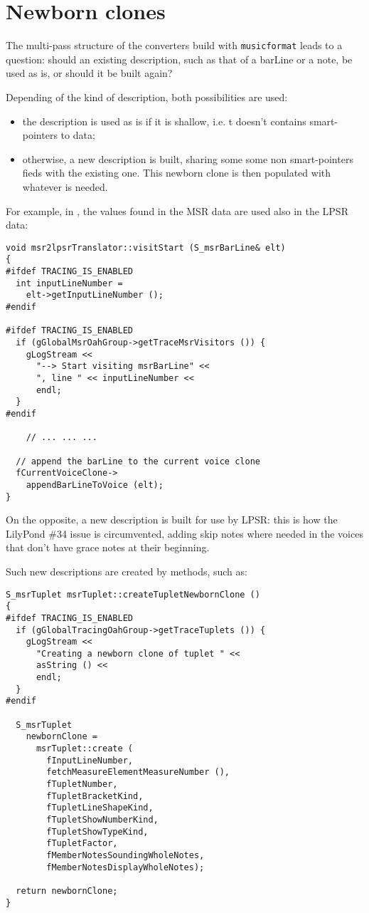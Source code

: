 \section{Newborn clones}

The multi-pass structure of the converters build with {\tt musicformat} leads to a question: should an existing description, such as that of a barLine or a note, be used as is, or should it be built again?

Depending of the kind of description, both possibilities are used:
\begin{itemize}
\item the description is used as is if it is shallow, i.e. t doesn't contains smart-pointers to data;
\item otherwise, a new description is built, sharing some some non smart-pointers fieds with the existing one. This newborn clone is then populated with whatever is needed.
\end{itemize}

For example, in \msrToLpsr{}, the  values found in the MSR data are used also in the LPSR data:
\begin{lstlisting}[language=CPlusPlus]
void msr2lpsrTranslator::visitStart (S_msrBarLine& elt)
{
#ifdef TRACING_IS_ENABLED
  int inputLineNumber =
    elt->getInputLineNumber ();
#endif

#ifdef TRACING_IS_ENABLED
  if (gGlobalMsrOahGroup->getTraceMsrVisitors ()) {
    gLogStream <<
      "--> Start visiting msrBarLine" <<
      ", line " << inputLineNumber <<
      endl;
  }
#endif

	// ... ... ...

  // append the barLine to the current voice clone
  fCurrentVoiceClone->
    appendBarLineToVoice (elt);
}
\end{lstlisting}

On the opposite, a new  description is built for use by LPSR: this is how the LilyPond \#34 issue is circumvented, adding skip notes where needed in the voices that don't have grace notes at their beginning.

Such new descriptions are created by  methods, such as:
\begin{lstlisting}[language=CPlusPlus]
S_msrTuplet msrTuplet::createTupletNewbornClone ()
{
#ifdef TRACING_IS_ENABLED
  if (gGlobalTracingOahGroup->getTraceTuplets ()) {
    gLogStream <<
      "Creating a newborn clone of tuplet " <<
      asString () <<
      endl;
  }
#endif

  S_msrTuplet
    newbornClone =
      msrTuplet::create (
        fInputLineNumber,
        fetchMeasureElementMeasureNumber (),
        fTupletNumber,
        fTupletBracketKind,
        fTupletLineShapeKind,
        fTupletShowNumberKind,
        fTupletShowTypeKind,
        fTupletFactor,
        fMemberNotesSoundingWholeNotes,
        fMemberNotesDisplayWholeNotes);

  return newbornClone;
}
\end{lstlisting}


